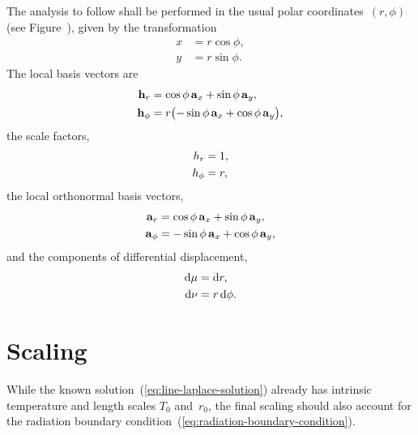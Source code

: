 The analysis to follow shall be performed
in the usual polar coordinates~$(r, \phi)$
(see Figure~\tbd),
given by the transformation
\begin{align}
  x &= r \cos\phi, \label{eq:polar-x-transformation} \\
  y &= r \sin\phi. \label{eq:polar-y-transformation}
\end{align}
The local basis vectors are
\begin{align}
  \localvec{r} &=
    \cos\phi \basisvec{x} + \sin\phi \basisvec{y},
    \label{eq:r-local-basis-vector} \\
  \localvec{\phi} &=
    r \roundbr[\big]{-\sin\phi \basisvec{x} + \cos\phi \basisvec{y}},
    \label{eq:phi-local-basis-vector}
\end{align}
the scale factors,
\begin{align}
  \scalefac[r] &= 1, \label{eq:r-scale-factor} \\
  \scalefac[\phi] &= r, \label{eq:phi-scale-factor}
\end{align}
the local orthonormal basis vectors,
\begin{align}
  \basisvec{r} &= \cos\phi \basisvec{x} + \sin\phi \basisvec{y},
    \label{eq:r-basis-vector} \\
  \basisvec{\phi} &= -\sin\phi \basisvec{x} + \cos\phi \basisvec{y},
    \label{eq:phi-basis-vector}
\end{align}
and the components of differential displacement,
\begin{align}
  \td \mu &= \td r,
    \label{eq:polar-differential-displacement-u-component} \\
  \td \nu &= r \td\phi.
    \label{eq:polar-differential-displacement-v-component}
\end{align}

\section{Scaling}
\label{sec:polar.scaling}

While the known solution~(\ref{eq:line-laplace-solution})
already has intrinsic temperature and length scales $T_0$ and~$r_0$,
the final scaling should also account for
the radiation boundary condition~(\ref{eq:radiation-boundary-condition}).


